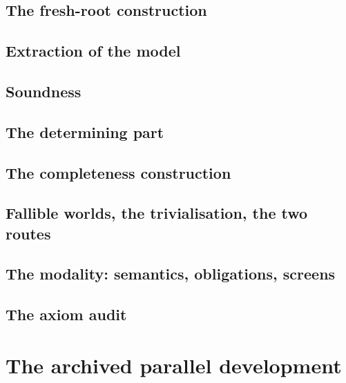 \documentclass[11pt,a4paper]{article}
\begin{document}
\subsection{The fresh-root construction}
\label{app:model}


\subsection{Extraction of the model}
\label{app:extract}


\subsection{Soundness}
\label{app:soundness}


\subsection{The determining part}
\label{app:completelean}


\subsection{The completeness construction}
\label{app:minimal}


\subsection{Fallible worlds, the trivialisation, the two routes}
\label{app:fallible}


\subsection{The modality: semantics, obligations, screens}
\label{app:modallean}


\subsection{The axiom audit}
\label{app:audit}


\section{The archived parallel development}
\label{app:archive}
\end{document}
